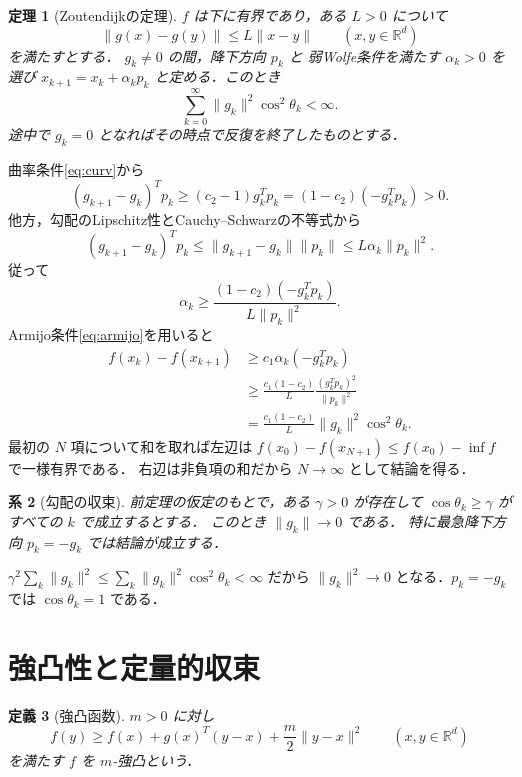 \documentclass[a5paper,10pt,onecolumn]{jsarticle}
\makeatletter
\theoremstyle{mathnotetheorem}
\newtheorem{theorem}{定理}[section]
\newtheorem{definition}[theorem]{定義}
\newtheorem{corollary}[theorem]{系}
\renewcommand{\proofname}{証明}
\renewenvironment{proof}[1][\proofname]{%
  \par\pushQED{\qed}\normalfont\topsep4\p@\@plus2\p@\relax
  \trivlist\item[\hskip\labelsep\bfseries #1]\ignorespaces
}{\popQED\endtrivlist\@endpefalse}
\newcommand{\norm}[1]{\lVert #1\rVert}
\makeatother
\begin{document}
\begin{theorem}[Zoutendijkの定理]\label{thm:zout}
$f$ は下に有界であり，ある $L>0$ について
\[
 \norm{g(x)-g(y)}\le L\norm{x-y}
 \qquad(x,y\in\mathbb R^d)
\]
を満たすとする．
$g_k\ne0$ の間，降下方向 $p_k$ と
弱Wolfe条件を満たす $\alpha_k>0$ を選び
$x_{k+1}=x_k+\alpha_kp_k$ と定める．このとき
\[
 \sum_{k=0}^{\infty}\norm{g_k}^2\cos^2\theta_k<\infty.
\]
途中で $g_k=0$ となればその時点で反復を終了したものとする．
\end{theorem}
\begin{proof}
曲率条件\eqref{eq:curv}から
\[
 (g_{k+1}-g_k)^Tp_k
 \ge(c_2-1)g_k^Tp_k
 =(1-c_2)(-g_k^Tp_k)>0.
\]
他方，勾配のLipschitz性とCauchy--Schwarzの不等式から
\[
 (g_{k+1}-g_k)^Tp_k
 \le\norm{g_{k+1}-g_k}\norm{p_k}
 \le L\alpha_k\norm{p_k}^2.
\]
従って
\[
 \alpha_k\ge\frac{(1-c_2)(-g_k^Tp_k)}{L\norm{p_k}^2}.
\]
Armijo条件\eqref{eq:armijo}を用いると
\begin{align*}
 f(x_k)-f(x_{k+1})
 &\ge c_1\alpha_k(-g_k^Tp_k)\\
 &\ge\frac{c_1(1-c_2)}{L}
       \frac{(g_k^Tp_k)^2}{\norm{p_k}^2}\\
 &=\frac{c_1(1-c_2)}{L}
           \norm{g_k}^2\cos^2\theta_k.
\end{align*}
最初の $N$ 項について和を取れば左辺は
$f(x_0)-f(x_{N+1})\le f(x_0)-\inf f$ で一様有界である．
右辺は非負項の和だから $N\to\infty$ として結論を得る．
\end{proof}

\begin{corollary}[勾配の収束]\label{cor:grad}
前定理の仮定のもとで，ある $\gamma>0$ が存在して
$\cos\theta_k\ge\gamma$ がすべての $k$ で成立するとする．
このとき $\norm{g_k}\to0$ である．
特に最急降下方向 $p_k=-g_k$ では結論が成立する．
\end{corollary}
\begin{proof}
$\gamma^2\sum_k\norm{g_k}^2\le
\sum_k\norm{g_k}^2\cos^2\theta_k<\infty$ だから
$\norm{g_k}^2\to0$ となる．$p_k=-g_k$ では
$\cos\theta_k=1$ である．
\end{proof}

\section{強凸性と定量的収束}
\begin{definition}[強凸函数]
$m>0$ に対し
\[
 f(y)\ge f(x)+g(x)^T(y-x)+\frac m2\norm{y-x}^2
 \qquad(x,y\in\mathbb R^d)
\]
を満たす $f$ を $m$-強凸という．
\end{definition}
\end{document}
